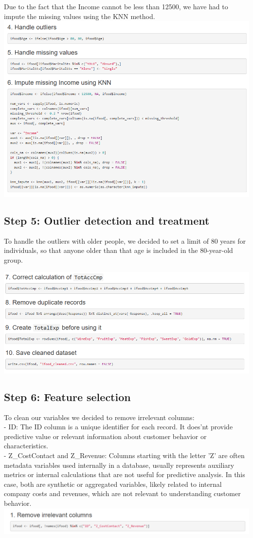 \documentclass[12pt,a4paper]{article}
\begin{document}
Due to the fact that the Income cannot be less than 12500, we have had to impute the missing values using the KNN method.\\

\includegraphics[width=\textwidth]{Imatges/pre2.png}
\subsection{Step 5: Outlier detection and treatment}
To handle the outliers with older people, we decided to set a limit of 80 years for individuals, so that anyone older than that age is included in the 80-year-old group.

\includegraphics[width=\textwidth]{Imatges/pre3.png}
\subsection{Step 6: Feature selection}
 To clean our variables we decided to remove irrelevant columns:\\
 - ID: The ID column is a unique identifier for each record. It does'nt provide predictive value or relevant information about customer behavior or characteristics.\\
 - Z\_CostContact and Z\_Revenue: Columns starting with the letter 'Z' are often metadata variables used internally in a database, usually represents auxiliary metrics or internal calculations that are not useful for predictive analysis. In this case, both are synthetic or aggregated variables, likely related to internal company costs and revenues, which are not relevant to understanding customer behavior. \\
 \includegraphics[width=\textwidth]{Imatges/pre8.png}
\end{document}
